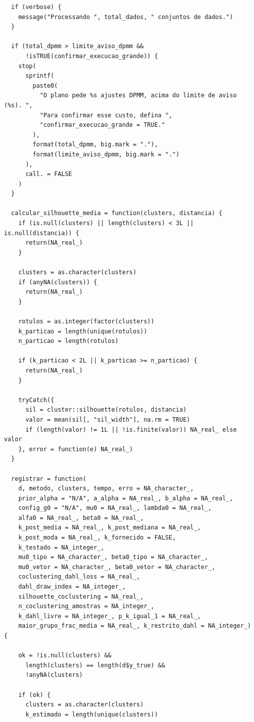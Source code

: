 \begin{verbatim}
  if (verbose) {
    message("Processando ", total_dados, " conjuntos de dados.")
  }
  
  if (total_dpmm > limite_aviso_dpmm &&
      !isTRUE(confirmar_execucao_grande)) {
    stop(
      sprintf(
        paste0(
          "O plano pede %s ajustes DPMM, acima do limite de aviso (%s). ",
          "Para confirmar esse custo, defina ",
          "confirmar_execucao_grande = TRUE."
        ),
        format(total_dpmm, big.mark = "."),
        format(limite_aviso_dpmm, big.mark = ".")
      ),
      call. = FALSE
    )
  }
   
  calcular_silhouette_media = function(clusters, distancia) {
    if (is.null(clusters) || length(clusters) < 3L || is.null(distancia)) {
      return(NA_real_)
    }
    
    clusters = as.character(clusters)
    if (anyNA(clusters)) {
      return(NA_real_)
    }
    
    rotulos = as.integer(factor(clusters))
    k_particao = length(unique(rotulos))
    n_particao = length(rotulos)
    
    if (k_particao < 2L || k_particao >= n_particao) {
      return(NA_real_)
    }
    
    tryCatch({
      sil = cluster::silhouette(rotulos, distancia)
      valor = mean(sil[, "sil_width"], na.rm = TRUE)
      if (length(valor) != 1L || !is.finite(valor)) NA_real_ else valor
    }, error = function(e) NA_real_)
  }
  
  registrar = function(
    d, metodo, clusters, tempo, erro = NA_character_,
    prior_alpha = "N/A", a_alpha = NA_real_, b_alpha = NA_real_,
    config_g0 = "N/A", mu0 = NA_real_, lambda0 = NA_real_,
    alfa0 = NA_real_, beta0 = NA_real_,
    k_post_media = NA_real_, k_post_mediana = NA_real_,
    k_post_moda = NA_real_, k_fornecido = FALSE,
    k_testado = NA_integer_,
    mu0_tipo = NA_character_, beta0_tipo = NA_character_,
    mu0_vetor = NA_character_, beta0_vetor = NA_character_,
    coclustering_dahl_loss = NA_real_,
    dahl_draw_index = NA_integer_,
    silhouette_coclustering = NA_real_,
    n_coclustering_amostras = NA_integer_,
    k_dahl_livre = NA_integer_, p_k_igual_1 = NA_real_,
    maior_grupo_frac_media = NA_real_, k_restrito_dahl = NA_integer_) {
    
    ok = !is.null(clusters) &&
      length(clusters) == length(d$y_true) &&
      !anyNA(clusters)
    
    if (ok) {
      clusters = as.character(clusters)
      k_estimado = length(unique(clusters))
      

\end{verbatim}
